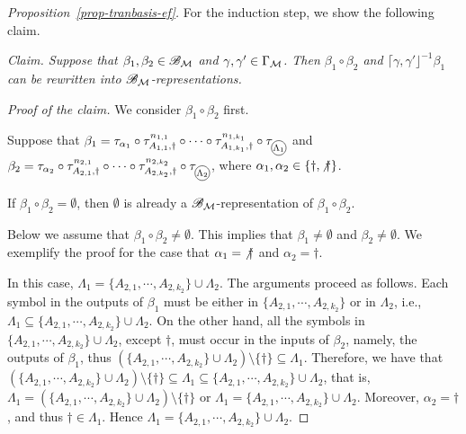 \begin{proof}[Proposition~\ref{prop-tranbasis-ef}]
	For the induction step, we show the following claim. 
	
	\noindent \emph{Claim. Suppose that $\beta_1, \beta_2 \in {\mathscr{B} }_{\mathcal{M} }$ and $\gamma, \gamma' \in \Gamma_{\mathcal{M} }$. Then $\beta_1 \circ \beta_2$ and $\lceil \gamma, \gamma' \rfloor^{-1}\beta_1$ can be rewritten into ${\mathscr{B} }_{\mathcal{M} }$-representations.}
	
	\smallskip
	
	\noindent \emph{Proof of the claim.}
	We consider $\beta_1 \circ \beta_2$ first.

	Suppose that $\beta_1 = \tau_{\alpha_1} \circ \tau^{n_{1,1}}_{A_{1,1}, \dag} \circ \cdots \circ \tau^{n_{1, k_1}}_{A_{1,k_1}, \dag} \circ \tau_{\mathcircled{\Lambda_1}}$ and $\beta_2 = \tau_{\alpha_2} \circ \tau^{n_{2,1}}_{A_{2,1}, \dag} \circ \cdots \circ \tau^{n_{2, k_2}}_{A_{2,k_2}, \dag} \circ \tau_{\mathcircled{\Lambda_2}}$, where $\alpha_1, \alpha_2 \in \{\dag, \not \dag\}$.
	
	If $\beta_1 \circ \beta_2 = \emptyset$, then $\emptyset$ is already a ${\mathscr{B} }_{\mathcal{M} }$-representation of $\beta_1 \circ \beta_2$. 
	
	Below we assume that $\beta_1 \circ \beta_2 \neq \emptyset$. This implies that $\beta_1 \neq \emptyset$ and $\beta_2 \neq \emptyset$.
	We exemplify the proof for the case that $\alpha_1 = {\not \dag}$ and  $\alpha_2 = \dag$.
	
	In this case, $\Lambda_1 =  \{A_{2,1}, \cdots, A_{2, k_2}\} \cup \Lambda_2$. The arguments proceed as follows. 
	Each symbol in the outputs of $\beta_1$ must be either in $\{A_{2,1}, \cdots, A_{2, k_2}\}$ or in $\Lambda_2$, i.e., $\Lambda_1 \subseteq   \{A_{2,1}, \cdots, A_{2, k_2}\} \cup \Lambda_2$. On the other hand, all the symbols in $\{A_{2,1}, \cdots, A_{2, k_2}\} \cup \Lambda_2$, except $\dag$, must occur in the inputs of $\beta_2$, namely, the outputs of $\beta_1$, thus  $(\{A_{2,1}, \cdots, A_{2, k_2}\} \cup \Lambda_2) \setminus \{\dag\} \subseteq \Lambda_1$.
	Therefore, we have that
	$(\{A_{2,1}, \cdots, A_{2, k_2}\} \cup \Lambda_2) \setminus \{\dag\} \subseteq \Lambda_1 \subseteq  \{A_{2,1}, \cdots, A_{2, k_2}\} \cup \Lambda_2$, that is, $\Lambda_1 = (\{A_{2,1}, \cdots, A_{2, k_2}\} \cup \Lambda_2) \setminus \{\dag\}$ or $\Lambda_1 =  \{A_{2,1}, \cdots, A_{2, k_2}\} \cup \Lambda_2$.
	Moreover, $\alpha_2 = \dag$, and thus $\dag \in \Lambda_1$. Hence  $\Lambda_1 =  \{A_{2,1}, \cdots, A_{2, k_2}\} \cup \Lambda_2$.
	

\end{proof}
